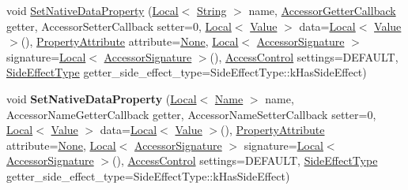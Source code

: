 \begin{DoxyCompactItemize}
\item 
void \mbox{\hyperlink{classv8_1_1Template_af6820f70079745cef28d5291ff21df29}{Set\+Native\+Data\+Property}} (\mbox{\hyperlink{classv8_1_1Local}{Local}}$<$ \mbox{\hyperlink{classv8_1_1String}{String}} $>$ name, \mbox{\hyperlink{namespacev8_a722613c87061708a4f1aa050d095f868}{Accessor\+Getter\+Callback}} getter, Accessor\+Setter\+Callback setter=0, \mbox{\hyperlink{classv8_1_1Local}{Local}}$<$ \mbox{\hyperlink{classv8_1_1Value}{Value}} $>$ data=\mbox{\hyperlink{classv8_1_1Local}{Local}}$<$ \mbox{\hyperlink{classv8_1_1Value}{Value}} $>$(), \mbox{\hyperlink{namespacev8_a05f25f935e108a1ea2d150e274602b87}{Property\+Attribute}} attribute=\mbox{\hyperlink{namespacev8_a05f25f935e108a1ea2d150e274602b87a7ab4d58719c33b3ea2dfaefa29b111df}{None}}, \mbox{\hyperlink{classv8_1_1Local}{Local}}$<$ \mbox{\hyperlink{classv8_1_1AccessorSignature}{Accessor\+Signature}} $>$ signature=\mbox{\hyperlink{classv8_1_1Local}{Local}}$<$ \mbox{\hyperlink{classv8_1_1AccessorSignature}{Accessor\+Signature}} $>$(), \mbox{\hyperlink{namespacev8_a31d8355cb043d7d2dda3f4a52760b64e}{Access\+Control}} settings=D\+E\+F\+A\+U\+LT, \mbox{\hyperlink{namespacev8_a29711319c2b9fc7716d65faee2f7b9cb}{Side\+Effect\+Type}} getter\+\_\+side\+\_\+effect\+\_\+type=Side\+Effect\+Type\+::k\+Has\+Side\+Effect)
\item 
\mbox{\label{classv8_1_1Template_adf16e2f0650da7996ccdffb997401040}} 
void {\bfseries Set\+Native\+Data\+Property} (\mbox{\hyperlink{classv8_1_1Local}{Local}}$<$ \mbox{\hyperlink{classv8_1_1Name}{Name}} $>$ name, Accessor\+Name\+Getter\+Callback getter, Accessor\+Name\+Setter\+Callback setter=0, \mbox{\hyperlink{classv8_1_1Local}{Local}}$<$ \mbox{\hyperlink{classv8_1_1Value}{Value}} $>$ data=\mbox{\hyperlink{classv8_1_1Local}{Local}}$<$ \mbox{\hyperlink{classv8_1_1Value}{Value}} $>$(), \mbox{\hyperlink{namespacev8_a05f25f935e108a1ea2d150e274602b87}{Property\+Attribute}} attribute=\mbox{\hyperlink{namespacev8_a05f25f935e108a1ea2d150e274602b87a7ab4d58719c33b3ea2dfaefa29b111df}{None}}, \mbox{\hyperlink{classv8_1_1Local}{Local}}$<$ \mbox{\hyperlink{classv8_1_1AccessorSignature}{Accessor\+Signature}} $>$ signature=\mbox{\hyperlink{classv8_1_1Local}{Local}}$<$ \mbox{\hyperlink{classv8_1_1AccessorSignature}{Accessor\+Signature}} $>$(), \mbox{\hyperlink{namespacev8_a31d8355cb043d7d2dda3f4a52760b64e}{Access\+Control}} settings=D\+E\+F\+A\+U\+LT, \mbox{\hyperlink{namespacev8_a29711319c2b9fc7716d65faee2f7b9cb}{Side\+Effect\+Type}} getter\+\_\+side\+\_\+effect\+\_\+type=Side\+Effect\+Type\+::k\+Has\+Side\+Effect)

\end{DoxyCompactItemize}
